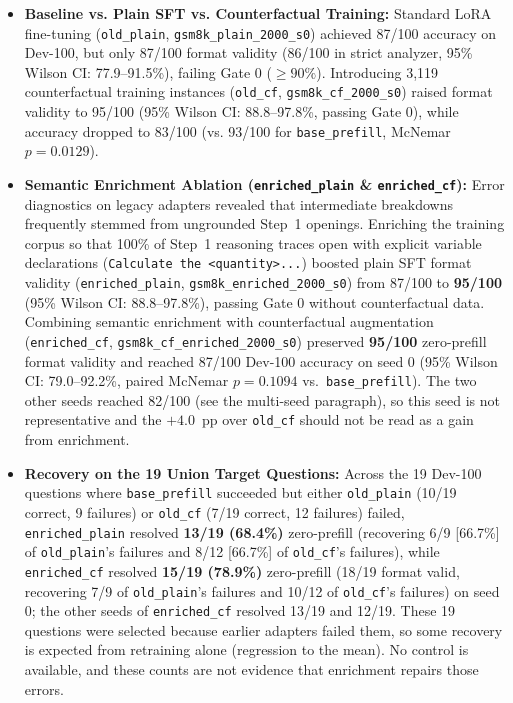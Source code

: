 \documentclass[11pt,a4paper]{article}
\begin{document}
\begin{itemize}
    \item \textbf{Baseline vs. Plain SFT vs. Counterfactual Training:} Standard LoRA fine-tuning (\texttt{old\_plain}, \texttt{gsm8k\_plain\_2000\_s0}) achieved 87/100 accuracy on Dev-100, but only 87/100 format validity (86/100 in strict analyzer, 95\% Wilson CI: 77.9--91.5\%), failing Gate 0 ($\ge 90\%$). Introducing 3,119 counterfactual training instances (\texttt{old\_cf}, \texttt{gsm8k\_cf\_2000\_s0}) raised format validity to 95/100 (95\% Wilson CI: 88.8--97.8\%, passing Gate 0), while accuracy dropped to 83/100 (vs. 93/100 for \texttt{base\_prefill}, McNemar $p = 0.0129$).
    
    \item \textbf{Semantic Enrichment Ablation (\texttt{enriched\_plain} \& \texttt{enriched\_cf}):} Error diagnostics on legacy adapters revealed that intermediate breakdowns frequently stemmed from ungrounded Step~1 openings. Enriching the training corpus so that 100\% of Step~1 reasoning traces open with explicit variable declarations (\texttt{Calculate the <quantity>...}) boosted plain SFT format validity (\texttt{enriched\_plain}, \texttt{gsm8k\_enriched\_2000\_s0}) from 87/100 to \textbf{95/100} (95\% Wilson CI: 88.8--97.8\%), passing Gate 0 without counterfactual data. Combining semantic enrichment with counterfactual augmentation (\texttt{enriched\_cf}, \texttt{gsm8k\_cf\_enriched\_2000\_s0}) preserved \textbf{95/100} zero-prefill format validity and reached 87/100 Dev-100 accuracy on seed 0 (95\% Wilson CI: 79.0--92.2\%, paired McNemar $p = 0.1094$ vs.\ \texttt{base\_prefill}). The two other seeds reached 82/100 (see the multi-seed paragraph), so this seed is not representative and the $+4.0$~pp over \texttt{old\_cf} should not be read as a gain from enrichment.
    
    \item \textbf{Recovery on the 19 Union Target Questions:} Across the 19 Dev-100 questions where \texttt{base\_prefill} succeeded but either \texttt{old\_plain} (10/19 correct, 9 failures) or \texttt{old\_cf} (7/19 correct, 12 failures) failed, \texttt{enriched\_plain} resolved \textbf{13/19 (68.4\%)} zero-prefill (recovering 6/9 [66.7\%] of \texttt{old\_plain}'s failures and 8/12 [66.7\%] of \texttt{old\_cf}'s failures), while \texttt{enriched\_cf} resolved \textbf{15/19 (78.9\%)} zero-prefill (18/19 format valid, recovering 7/9 of \texttt{old\_plain}'s failures and 10/12 of \texttt{old\_cf}'s failures) on seed 0; the other seeds of \texttt{enriched\_cf} resolved 13/19 and 12/19. These 19 questions were selected because earlier adapters failed them, so some recovery is expected from retraining alone (regression to the mean). No control is available, and these counts are not evidence that enrichment repairs those errors.
    

\end{itemize}
\end{document}
